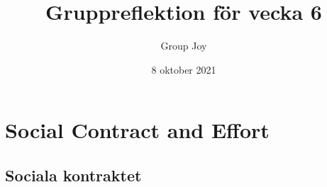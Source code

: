\documentclass{scrartcl}
\begin{document}
\title{Gruppreflektion för vecka 6}
\author{Group Joy}
\date{8 oktober 2021}
\maketitle

\section{Social Contract and Effort}

\subsection{Sociala kontraktet}
\end{document}

